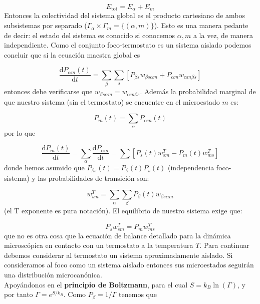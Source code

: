 \documentclass[12pt,a4paper]{article}
\numberwithin{equation}{section}
\numberwithin{figure}{section}
\newcommand{\ccorchetes}[1]{\left[ #1  \right]}
\newcommand{\D}{\mathrm{d}}
\newcommand{\derivadas}[2]{\frac{\D #1}{\D #2}}
\theoremstyle{definition}
\begin{document}
\begin{equation}
E_{\mathrm{tot}} = E_\alpha + E_m
\end{equation}
Entonces la colectividad del sistema global es el producto cartesiano de ambos subsistemas por separado ($\Gamma_\alpha \times \Gamma_m = \{ (\alpha,m) \}$). Esto es una manera pedante de decir: el estado del sistema es conocido si conocemos $\alpha,m$ a la vez, de manera independiente. Como el conjunto foco-termostato es un sistema aislado podemos concluir que si la ecuación maestra global es

\begin{equation}
\derivadas{P_{\alpha m} (t)}{t} = \sum_\beta \sum_s \ccorchetes{P_{\beta s} w_{\beta s \alpha m} + P_{\alpha m} w_{\alpha m \beta s}}
\end{equation}
entonces debe verificarse que $w_{\beta s \alpha m}=w_{\alpha m \beta s}$. Además la probabilidad marginal de que nuestro sistema (sin el termostato) se encuentre en el microestado $m$ es:

\begin{equation}
P_m (t) = \sum_\alpha P_{\alpha m} (t)
\end{equation}
por lo que

\begin{equation}
\derivadas{P_m(t)}{t} = \sum_{\alpha} \derivadas{P_{\alpha m}}{t} = \sum \ccorchetes{P_s(t) w_{sm}^T - P_m (t) w_{ms}^T}
\end{equation}
donde hemos asumido  que $P_{\beta s} (t) = P_\beta (t) P_s (t)$ (independencia foco-sistema) y las probabilidades de transición son:

\begin{equation}
w_{sm}^T = \sum_\alpha \sum_\beta P_\beta (t) w_{\beta s \alpha m}
\end{equation}
(el T exponente es pura notación). El equilibrio de nuestro sistema exige que:

\begin{equation}
P_s w_{sm}^T = P_m w_{ms}^T   \label{Ec:1.4.020}
\end{equation}
que no es otra cosa que la ecuación de balance detallado para la dinámica microscópica en contacto con un termostato a la temperatura $T$. Para continuar debemos considerar al termostato un sistema aproximadamente aislado. Si consideramos al foco como un sistema aislado entonces sus microestados seguirán una distribución microcanónica. \\

Apoyándonos en el \textbf{principio de Boltzmann}, para el cual $S=k_B \ln ( \Gamma )$, y por tanto $\Gamma = e^{S / k_B}$. Como $P_\beta = 1/\Gamma$ tenemos que
\end{document}
